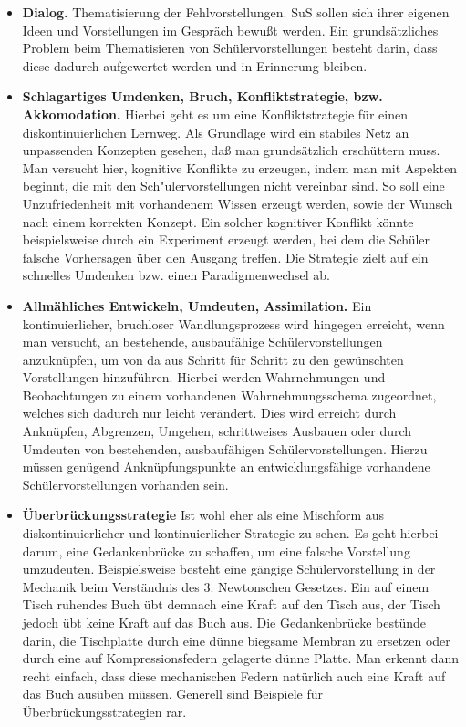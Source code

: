 \begin{itemize}
\item \textbf{Dialog.} Thematisierung der Fehlvorstellungen. SuS sollen sich ihrer eigenen Ideen und Vorstellungen im Gespr{\"a}ch bewu{\ss}t werden.  Ein grunds{\"a}tzliches Problem beim Thematisieren von Sch\"{u}lervorstellungen besteht darin, dass diese dadurch aufgewertet werden und in Erinnerung bleiben. 


\item \textbf{Schlagartiges Umdenken, Bruch, Konfliktstrategie, bzw. Akkomodation.} Hierbei geht es um eine Konfliktstrategie f{\"u}r einen diskontinuierlichen Lernweg. Als Grundlage wird ein stabiles Netz an unpassenden Konzepten gesehen, da{\ss} man grunds{\"a}tzlich ersch{\"u}ttern muss. Man versucht hier, kognitive Konflikte zu erzeugen, indem man mit Aspekten beginnt, die mit den Sch{"u}lervorstellungen nicht vereinbar sind. So soll eine Unzufriedenheit mit vorhandenem Wissen erzeugt werden, sowie der Wunsch nach einem korrekten Konzept.  Ein solcher kognitiver Konflikt k\"{o}nnte beispielsweise durch ein Experiment erzeugt werden, bei dem die Sch\"{u}ler falsche Vorhersagen \"{u}ber den Ausgang treffen. Die Strategie zielt auf ein schnelles Umdenken bzw. einen Paradigmenwechsel ab. 

\item \textbf{Allm\"{a}hliches Entwickeln, Umdeuten, Assimilation.}  Ein kontinuierlicher, bruchloser Wandlungsprozess wird hingegen erreicht, wenn man versucht, an bestehende, ausbauf\"{a}hige Sch\"{u}lervorstellungen anzukn\"{u}pfen, um von da aus Schritt f\"{u}r Schritt zu den gew\"{u}nschten Vorstellungen hinzuf\"{u}hren. Hierbei werden Wahrnehmungen und Beobachtungen zu einem vorhandenen Wahrnehmungsschema zugeordnet, welches sich dadurch nur leicht ver\"{a}ndert. Dies wird erreicht durch Ankn\"{u}pfen, Abgrenzen, Umgehen, schrittweises Ausbauen oder durch Umdeuten von bestehenden, ausbauf\"{a}higen  Sch\"{u}lervorstellungen. Hierzu m\"{u}ssen gen\"{u}gend Ankn\"{u}pfungspunkte an entwicklungsf\"{a}hige vorhandene Sch\"{u}lervorstellungen vorhanden sein. 

\item \textbf{{\"U}berbr{\"u}ckungsstrategie} Ist wohl eher als eine Mischform aus diskontinuierlicher und kontinuierlicher Strategie zu sehen. Es geht hierbei darum, eine Gedankenbr\"{u}cke zu schaffen, um eine falsche Vorstellung umzudeuten. Beispielsweise besteht eine g\"{a}ngige Sch\"{u}lervorstellung in der Mechanik beim Verst\"{a}ndnis des 3. Newtonschen Gesetzes. Ein auf einem Tisch ruhendes Buch \"{u}bt demnach eine Kraft auf den Tisch aus, der Tisch jedoch \"{u}bt keine Kraft auf das Buch aus. Die Gedankenbr\"{u}cke best\"{u}nde darin, die Tischplatte durch eine d\"{u}nne biegsame Membran zu ersetzen oder durch eine auf Kompressionsfedern gelagerte d\"{u}nne Platte. Man erkennt dann recht einfach, dass diese mechanischen Federn nat\"{u}rlich auch eine Kraft auf das Buch aus\"{u}ben m\"{u}ssen. Generell sind Beispiele f\"{u}r \"{U}berbr{\"u}ckungsstrategien rar.
\end{itemize}

